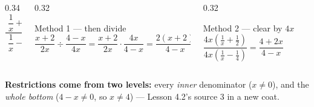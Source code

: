 \documentclass[aspectratio=169, 11pt]{beamer}
\begin{document}
\begin{frame}[t, plain]
  \begin{columns}[T]
    \begin{column}{0.34\textwidth}
      \[ \frac{\;\dfrac{1}{x}+\dfrac{1}{2}\;}{\;\dfrac{1}{x}-\dfrac{1}{4}\;} \]
    \end{column}
    \begin{column}{0.32\textwidth}
      \begin{block}{Method 1 --- then divide}
        $\dfrac{x+2}{2x}\div\dfrac{4-x}{4x}
         =\dfrac{x+2}{2x}\cdot\dfrac{4x}{4-x}=\dfrac{2(x+2)}{4-x}$
      \end{block}
    \end{column}
    \begin{column}{0.32\textwidth}
      \begin{block}{Method 2 --- clear by $4x$}
        $\dfrac{4x\left(\frac1x+\frac12\right)}{4x\left(\frac1x-\frac14\right)}
         =\dfrac{4+2x}{4-x}$
      \end{block}
    \end{column}
  \end{columns}
  \vspace{6pt}
  \begin{center}
    \textbf{Restrictions come from two levels:} every \emph{inner} denominator ($x\neq0$), and the
    \emph{whole bottom} ($4-x\neq0$, so $x\neq4$) --- Lesson 4.2's source 3 in a new coat.
  \end{center}
\end{frame}
\end{document}
